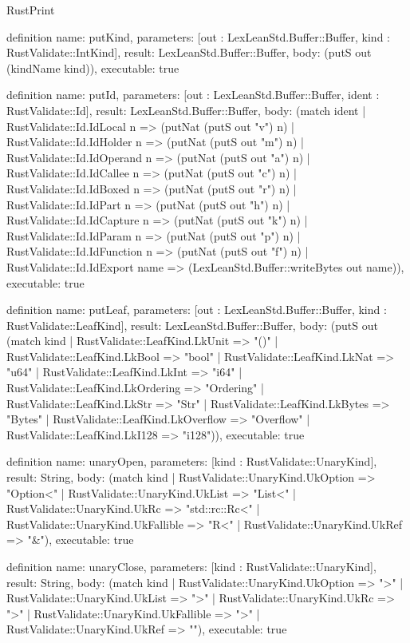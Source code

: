 \begin{lexlean}{RustPrint}
\begin{semanticmodule}
definition{
  name: putKind,
  parameters: [out : LexLeanStd.Buffer::Buffer, kind : RustValidate::IntKind],
  result: LexLeanStd.Buffer::Buffer,
  body: (putS out (kindName kind)),
  executable: true
}

definition{
  name: putId,
  parameters: [out : LexLeanStd.Buffer::Buffer, ident : RustValidate::Id],
  result: LexLeanStd.Buffer::Buffer,
  body: (match ident
    | RustValidate::Id.IdLocal n => (putNat (putS out "v") n)
    | RustValidate::Id.IdHolder n => (putNat (putS out "m") n)
    | RustValidate::Id.IdOperand n => (putNat (putS out "a") n)
    | RustValidate::Id.IdCallee n => (putNat (putS out "c") n)
    | RustValidate::Id.IdBoxed n => (putNat (putS out "r") n)
    | RustValidate::Id.IdPart n => (putNat (putS out "h") n)
    | RustValidate::Id.IdCapture n => (putNat (putS out "k") n)
    | RustValidate::Id.IdParam n => (putNat (putS out "p") n)
    | RustValidate::Id.IdFunction n => (putNat (putS out "f") n)
    | RustValidate::Id.IdExport name => (LexLeanStd.Buffer::writeBytes out name)),
  executable: true
}

definition{
  name: putLeaf,
  parameters: [out : LexLeanStd.Buffer::Buffer, kind : RustValidate::LeafKind],
  result: LexLeanStd.Buffer::Buffer,
  body: (putS out (match kind
    | RustValidate::LeafKind.LkUnit => "()"
    | RustValidate::LeafKind.LkBool => "bool"
    | RustValidate::LeafKind.LkNat => "u64"
    | RustValidate::LeafKind.LkInt => "i64"
    | RustValidate::LeafKind.LkOrdering => "Ordering"
    | RustValidate::LeafKind.LkStr => "Str"
    | RustValidate::LeafKind.LkBytes => "Bytes"
    | RustValidate::LeafKind.LkOverflow => "Overflow"
    | RustValidate::LeafKind.LkI128 => "i128")),
  executable: true
}

definition{
  name: unaryOpen,
  parameters: [kind : RustValidate::UnaryKind],
  result: String,
  body: (match kind
    | RustValidate::UnaryKind.UkOption => "Option<"
    | RustValidate::UnaryKind.UkList => "List<"
    | RustValidate::UnaryKind.UkRc => "std::rc::Rc<"
    | RustValidate::UnaryKind.UkFallible => "R<"
    | RustValidate::UnaryKind.UkRef => "&"),
  executable: true
}

definition{
  name: unaryClose,
  parameters: [kind : RustValidate::UnaryKind],
  result: String,
  body: (match kind
    | RustValidate::UnaryKind.UkOption => ">"
    | RustValidate::UnaryKind.UkList => ">"
    | RustValidate::UnaryKind.UkRc => ">"
    | RustValidate::UnaryKind.UkFallible => ">"
    | RustValidate::UnaryKind.UkRef => ""),
  executable: true
}


\end{semanticmodule}
\end{lexlean}
